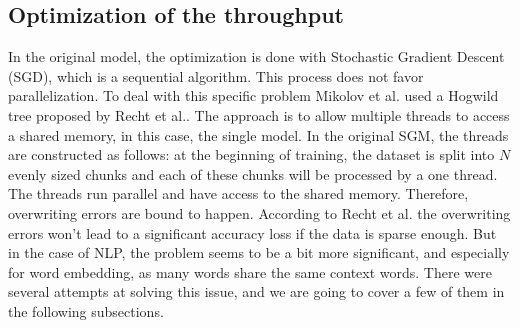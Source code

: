 \subsection{Optimization of the throughput}

In the original model, the optimization is done with Stochastic Gradient Descent (SGD), which is a sequential algorithm. This process does not favor parallelization. To deal with this specific problem Mikolov et al.\cite{mikolov2} used a Hogwild tree proposed by Recht et al.\cite{hogwild}. The approach is to allow multiple threads to access a shared memory, in this case, the single model. In the original SGM, the threads are constructed as follows: at the beginning of training, the dataset is split into $N$ evenly sized chunks and each of these chunks will be processed by a one thread. The threads run parallel and have access to the shared memory. Therefore, overwriting errors are bound to happen. According to Recht et al.\cite{hogwild} the overwriting errors won't lead to a significant accuracy loss if the data is sparse enough. But in the case of NLP, the problem seems to be a bit more significant, and especially for word embedding, as many words share the same context words. There were several attempts at solving this issue, and we are going to cover a few of them in the following subsections.

